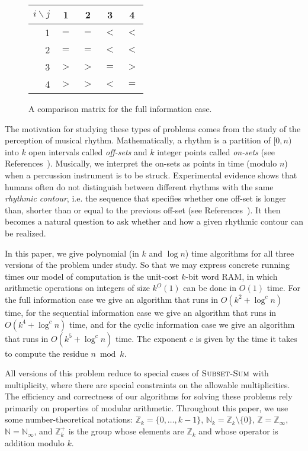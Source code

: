 \documentclass[11pt]{patmorin}
\newcommand{\Z}{\mathbb{Z}}
\newcommand{\N}{\mathbb{N}}
\newcommand{\defeq}{=}
\begin{document}
\begin{figure}
\begin{center}
\begin{tabular}{r|cccc}
$i\backslash j$ & 1 & 2 & 3 & 4 \\ \hline
1 & $=$ & $=$ & $<$ & $<$ \\
2 & $=$ & $=$ & $<$ & $<$ \\
3 & $>$ & $>$ & $=$ & $>$ \\
4 & $>$ & $>$ & $<$ & $=$ \\
\end{tabular}
\end{center}
\caption{A comparison matrix for the full information case.}
\end{figure}

The motivation for studying these types of problems comes from the
study of the perception of musical rhythm.  Mathematically, a rhythm
is a partition  of $[0,n)$ into $k$ open intervals called
\emph{off-sets} and $k$ integer points called \emph{on-sets} (see
References~\cite{dfgrt04,t02,t03a,t03b,t04}).  Musically, we interpret
the on-sets as points in time (modulo $n$) when a percussion
instrument is to be struck.  Experimental evidence shows that humans
often do not distinguish between different rhythms with the same
\emph{rhythmic contour}, i.e.  the sequence that specifies whether one
off-set is longer than, shorter than or equal to the previous off-set
(see References~\cite{d78,ftrkp04,kcgv00,l96}).  It then becomes a
natural question to ask whether and how a given rhythmic contour can
be realized.

In this paper, we give polynomial (in $k$ and $\log n$) time
algorithms for all three versions of the problem under study.  So that
we may express concrete running times our model of computation is the
unit-cost $k$-bit word RAM, in which arithmetic operations on integers
of size $k^O(1)$ can be done in $O(1)$ time.  For the full information
case we give an algorithm that runs in $O(k^2 + \log^cn)$ time, for
the sequential information case we give an algorithm that runs in
$O(k^4+\log^c n)$ time, and for the cyclic information case we give an
algorithm that runs in $O(k^5+\log^c n)$ time.  The exponent $c$ is
given by the time it takes to compute the residue $n\bmod k$.

All versions of this problem reduce to special cases of
$\textsc{Subset-Sum}$ with multiplicity, where there are special
constraints on the allowable multiplicities.  The efficiency and
correctness of our algorithms for solving these problems rely
primarily on properties of modular arithmetic. Throughout this paper,
we use some number-theoretical notations: $\Z_k\defeq
\{0,\ldots,k-1\}$, $\N_k\defeq\Z_k\setminus\{0\}$,
$\Z\defeq\Z_\infty$, $\N\defeq\N_\infty$, and $\Z_k^+$ is the group
whose elements are $\Z_k$ and whose operator is addition modulo $k$.
\end{document}
